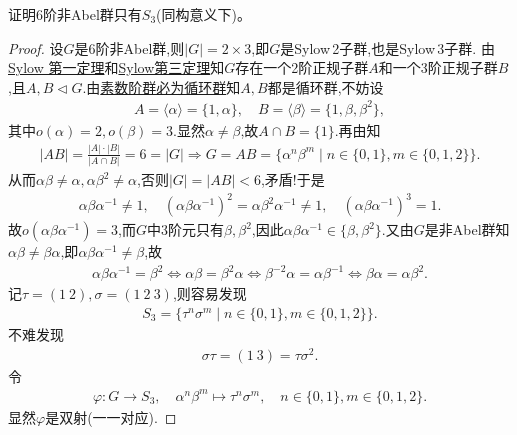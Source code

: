 \documentclass[../../main.tex]{subfiles}%
\begin{document}
\begin{example}
证明6阶非Abel群只有$S_3$(同构意义下)。
\end{example}
\begin{proof}
设$G$是6阶非Abel群,则$|G|=2\times 3$,即$G$是Sylow$\,$2子群,也是Sylow$\,$3子群.
由\hyperref[theorem:Sylow 第一定理]{Sylow 第一定理}和\hyperref[theorem:Sylow第三定理]{Sylow第三定理}知$G$存在一个2阶正规子群$A$和一个3阶正规子群$B$,且$A,B\lhd G$.由\hyperref[proposition:素数阶群必为循环群]{素数阶群必为循环群}知$A,B$都是循环群,不妨设
\begin{align*}
A=\langle \alpha \rangle =\{ 1,\alpha \} ,\quad B=\langle \beta \rangle =\{ 1,\beta ,\beta^2 \} ,
\end{align*}
其中$o(\alpha)=2,o(\beta)=3$.显然$\alpha \ne \beta$,故$A\cap B=\{ 1 \}$.再由知
\begin{align*}
|AB|=\frac{|A|\cdot |B|}{|A\cap B|}=6=|G|\Longrightarrow G=AB=\{ \alpha^n\beta^m\mid n\in \{ 0,1 \} ,m\in \{ 0,1,2 \} \} .
\end{align*}
从而$\alpha \beta \ne \alpha ,\alpha \beta^2\ne \alpha$,否则$|G|=|AB|<6$,矛盾!于是
\begin{align*}
\alpha \beta \alpha^{-1}\ne 1,\quad (\alpha \beta \alpha^{-1})^2=\alpha \beta^2\alpha^{-1}\ne 1,\quad (\alpha \beta \alpha^{-1})^3=1.
\end{align*}
故$o(\alpha \beta \alpha^{-1})=3$,而$G$中3阶元只有$\beta ,\beta^2$,因此$\alpha \beta \alpha^{-1}\in \{ \beta ,\beta^2 \} $.又由$G$是非Abel群知$\alpha \beta \ne \beta \alpha$,即$\alpha \beta \alpha^{-1}\ne \beta$,故
\begin{align}
\alpha \beta \alpha^{-1}=\beta^2\Longleftrightarrow \alpha \beta =\beta^2\alpha \Longleftrightarrow \beta^{-2}\alpha =\alpha \beta^{-1}\Longleftrightarrow \beta \alpha =\alpha \beta^2.
\label{eq::--HUHFWIUQQH1}
\end{align}
记$\tau=(1\ 2),\sigma=(1\ 2\ 3)$,则容易发现
\begin{align*}
S_3=\{ \tau^n\sigma^m\mid n\in \{ 0,1 \} ,m\in \{ 0,1,2 \} \} .
\end{align*}
不难发现
\begin{align}
\sigma \tau=(1\ 3)=\tau \sigma^2.
\label{eq::--HUHFWIUQQH2}
\end{align}
令
\begin{align*}
\varphi :G\rightarrow S_3,\quad \alpha^n\beta^m\mapsto \tau^n\sigma^m,\quad n\in \{ 0,1 \} ,m\in \{ 0,1,2 \} .
\end{align*}
显然$\varphi$是双射(一一对应).

\end{proof}
\end{document}
